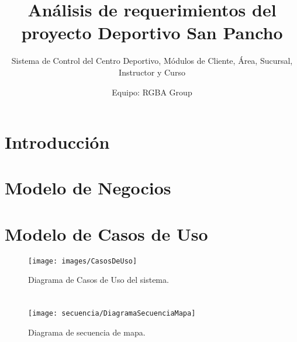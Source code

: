\documentclass[oneside,10pt]{book}
\title{Análisis de requerimientos del proyecto Deportivo San Pancho}
\subtitle{Sistema de Control del Centro Deportivo, Módulos de Cliente, Área, Sucursal, Instructor y Curso}
\author{Equipo: RGBA Group}
\begin{document}
\maketitle
\thispagestyle{empty}

\frontmatter
\tableofcontents

\mainmatter
\chapter{Introducción}

\chapter{Modelo de Negocios}


\chapter{Modelo de Casos de Uso}

\begin{figure}[htbp!]
		\centering
			\texttt{[image: images/CasosDeUso]}
		\caption{Diagrama de Casos de Uso del sistema.}
	\end{figure}
	

\chapter{}

	\begin{figure}[htbp!]
		\centering
			\texttt{[image: secuencia/DiagramaSecuenciaMapa]}
		\caption{Diagrama de secuencia de mapa.}
	\end{figure}
	
\end{document}
